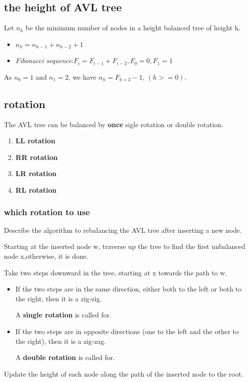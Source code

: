 \documentclass{article}
\begin{document}
\subsection{the height of AVL tree}
Let $n_h$ be the minimum number of nodes in a height balanced tree of height h.\par
\begin{itemize}
    \item $n_h = n_{h-1} + n_{h-2} + 1$
    \item \textit{Fibonacci sequence}:$F_i = F_{i-1} + F_{i-2},F_0 = 0,F_1 = 1$
\end{itemize}

As $n_0 = 1$ and $n_1 = 2$, we have {\textbf{$n_h = F_{h+3} - 1$}}, $(h >= 0)$.

\subsection{rotation}
The AVL tree can be balanced by \textbf{once} sigle rotation or double rotation.
\begin{enumerate}
    \item \textbf{LL rotation}
    \item \textbf{RR rotation}
    \item \textbf{LR rotation}
    \item \textbf{RL rotation}
\end{enumerate}

\subsubsection{which rotation to use}
Describe the algorithm to rebalancing the AVL tree after inserting a new node.\par
Starting at the inserted node w, traverse up the tree to find the first unbalanced node x,otherwise, it is done.\par
Take two steps downward in the tree, starting at x towards the path to w.\par
\begin{itemize}
    \item If the two steps are in the same direction, either both to the left or both to the right, then it is a zig-zig.\par
    A \textbf{single rotation} is called for.
    \item If the two steps are in opposite directions (one to the left and the other to the right), then it is a zig-zag.\par
    A \textbf{double rotation} is called for.    
\end{itemize}\par
Update the height of each node along the path of the inserted node to the root.
\end{document}
